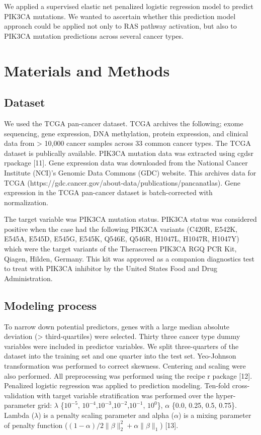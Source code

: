 \documentclass[10pt,letterpaper]{article}
\begin{document}
We applied a supervised elastic net penalized logistic regression model
to predict PIK3CA mutations. We wanted to ascertain whether this
prediction model approach could be applied not only to RAS pathway
activation, but also to PIK3CA mutation predictions across several
cancer types.

\hypertarget{materials-and-methods}{%
\section{Materials and Methods}\label{materials-and-methods}}

\hypertarget{dataset}{%
\subsection{Dataset}\label{dataset}}

We used the TCGA pan-cancer dataset. TCGA archives the following; exome
sequencing, gene expression, DNA methylation, protein expression, and
clinical data from \textgreater{} 10,000 cancer samples across 33 common
cancer types. The TCGA dataset is publically available. PIK3CA mutation
data was extracted using cgdsr rpackage {[}11{]}. Gene expression data
was downloaded from the National Cancer Institute (NCI)'s Genomic Data
Commons (GDC) website. This archives data for TCGA
(https://gdc.cancer.gov/about-data/publications/pancanatlas). Gene
expression in the TCGA pan-cancer dataset is batch-corrected with
normalization.

The target variable was PIK3CA mutation status. PIK3CA status was
considered positive when the case had the following PIK3CA variants
(C420R, E542K, E545A, E545D, E545G, E545K, Q546E, Q546R, H1047L, H1047R,
H1047Y) which were the target variants of the Therascreen PIK3CA RGQ PCR
Kit, Qiagen, Hilden, Germany. This kit was approved as a companion
diagnostics test to treat with PIK3CA inhibitor by the United States
Food and Drug Administration.

\hypertarget{modeling-process}{%
\subsection{Modeling process}\label{modeling-process}}

To narrow down potential predictors, genes with a large median absolute
deviation (\textgreater{} third-quartiles) were selected. Thirty three
cancer type dummy variables were included in predictor variables. We
split three-quarters of the dataset into the training set and one
quarter into the test set. Yeo-Johnson transformation was performed to
correct skewness. Centering and scaling were also performed. All
preprocessing was performed using the recipe r package {[}12{]}.
Penalized logistic regression was applied to prediction modeling.
Ten-fold cross-validation with target variable stratification was
performed over the hyper-parameter grid: \(\lambda\) \{\(10^{-5}\),
\(10^{-4}\),\(10^{-3}\),\(10^{-2}\),\(10^{-1}\), \(10^{0}\)\},
\(\alpha\) \{0.0, 0.25, 0.5, 0.75\}. Lambda (\(\lambda\)) is a penalty
scaling parameter and alpha (\(\alpha\)) is a mixing parameter of
penalty function
(\((1-\alpha)/2 \lVert\beta\rVert_2^2+\alpha\lVert \beta \rVert_1\))
{[}13{]}.
\end{document}
